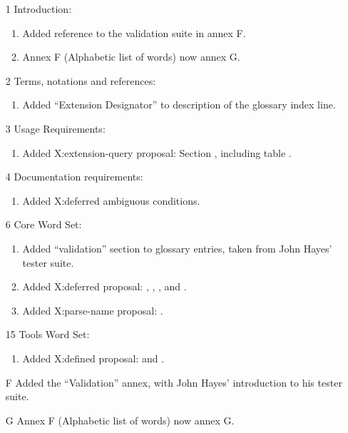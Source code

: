 	\begin{enumerate}
	\item[1] Introduction:
		\begin{enumerate}
		\item Added reference to the validation suite in annex F.
		\item Annex F (Alphabetic list of words) now annex G.
		\end{enumerate}

	\item[2] Terms, notations and references:
		\begin{enumerate}
		\item Added ``Extension Designator'' to description of the
			glossary index line.
		\end{enumerate}

	\item[3] Usage Requirements:
		\begin{enumerate}
		\item Added \textsf{X:extension-query} proposal:
			Section , including table
			.
		\end{enumerate}

	\item[4] Documentation requirements:
		\begin{enumerate}
		\item Added \textsf{X:deferred} ambiguous conditions.
		\end{enumerate}

	\item[6] Core Word Set:
		\begin{enumerate}
		\item Added ``validation'' section to glossary entries, taken
			from John Hayes' tester suite.
		\item Added \textsf{X:deferred} proposal:
			,
			,
			,
			 and
			.
		\item Added \textsf{X:parse-name} proposal:
			.
		\end{enumerate}

	\item[15] Tools Word Set:
		\begin{enumerate}
		\item Added \textsf{X:defined} proposal:
			 and
			.
		\end{enumerate}

	\item[F] Added the ``Validation'' annex, with John Hayes'
		introduction to his tester suite.

	\item[G] Annex F (Alphabetic list of words) now annex G.
	\end{enumerate}

